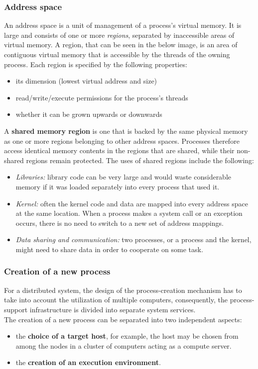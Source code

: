 \subsubsection{Address space}
An address space is a unit of management of a process’s virtual memory. It is large and consists of one or more \textit{regions}, separated by inaccessible areas of virtual memory. A region, that can be seen in the below image, is an area of contiguous virtual memory that is accessible by the threads of the owning process.
Each region is specified by the following properties:
\begin{itemize}
	\item its dimension (lowest virtual address and size)
	\item read/write/execute permissions for the process’s threads
	\item whether it can be grown upwards or downwards
\end{itemize}
A \textbf{shared memory region} is one that is backed by the same physical memory as one or more regions belonging to other address spaces. Processes therefore access identical memory contents in the regions that are shared, while their non-shared regions remain protected. The uses of shared regions include the following:
\begin{itemize}
	\item \textit{Libraries:} library code can be very large and would waste considerable memory if it was loaded separately into every process that used it.
	\item \textit{Kernel:} often the kernel code and data are mapped into every address space at the same location. When a process makes a system call or an exception occurs, there is no need to switch to a new set of address mappings.
	\item \textit{Data sharing and communication:} two processes, or a process and the kernel, might need to share data in order to cooperate on some task.
\end{itemize}

\subsubsection{Creation of a new process}
For a distributed system, the design of the process-creation mechanism has to take into account the utilization of multiple computers, consequently, the process-support infrastructure is divided into separate system services.\\
The creation of a new process can be separated into two independent aspects:
\begin{itemize}
	\item the \textbf{choice of a target host}, for example, the host may be chosen from among the nodes in a cluster of computers acting as a compute server.
	\item the \textbf{creation of an execution environment}.
\end{itemize}
